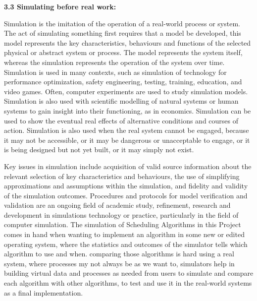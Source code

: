 \documentclass{article} %
\begin{document}
\noindent 

\noindent \textbf{}

\noindent \textbf{3.3 Simulating before real work:}

\noindent Simulation is the imitation of the operation of a real-world process or system. The act of simulating something first requires that a model be developed, this model represents the key characteristics, behaviours and functions of the selected physical or abstract system or process. The model represents the system itself, whereas the simulation represents the operation of the system over time. Simulation is used in many contexts, such as simulation of technology for performance optimization, safety engineering, testing, training, education, and video games. Often, computer experiments are used to study simulation models. Simulation is also used with scientific modelling of natural systems or human systems to gain insight into their functioning, as in economics. Simulation can be used to show the eventual real effects of alternative conditions and courses of action. Simulation is also used when the real system cannot be engaged, because it may not be accessible, or it may be dangerous or unacceptable to engage, or it is being designed but not yet built, or it may simply not exist.

\noindent Key issues in simulation include acquisition of valid source information about the relevant selection of key characteristics and behaviours, the use of simplifying approximations and assumptions within the simulation, and fidelity and validity of the simulation outcomes. Procedures and protocols for model verification and validation are an ongoing field of academic study, refinement, research and development in simulations technology or practice, particularly in the field of computer simulation. The simulation of Scheduling Algorithms in this Project comes in hand when wanting to implement an algorithm in some new or edited operating system, where the statistics and outcomes of the simulator tells which algorithm to use and when. comparing those algorithms is hard using a real system, where processes my not always be as we want to, simulators help in building virtual data and processes as needed from users to simulate and compare each algorithm with other algorithms, to test and use it in the real-world systems as a final implementation.

\noindent 

\noindent 
\section{}
\end{document}
